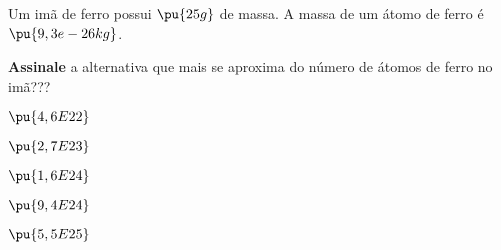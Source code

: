 \begin{problem}[
    id = 1A01,
]

Um imã de ferro possui \(\pu{25 g}\) de massa. A massa de um átomo de ferro é \(\pu{9,3e-26 kg}\).

\textbf{Assinale} a alternativa que mais se aproxima do número de átomos de ferro no imã???

\begin{choices}
    \item \(\pu{4,6E22}\)
    \item \(\pu{2,7E23}\)
    \item \(\pu{1,6E24}\)
    \item \(\pu{9,4E24}\)
    \item \(\pu{5,5E25}\)
\end{choices}

\end{problem}